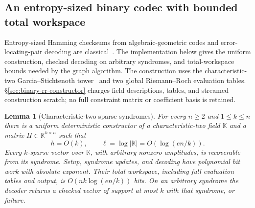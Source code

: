 \documentclass[11pt,letterpaper]{article}
\newtheorem{lemma}[theorem]{Lemma}
\numberwithin{equation}{section}
\begin{document}
\subsection{An entropy-sized binary codec with bounded total workspace}

Entropy-sized Hamming checksums from algebraic-geometric codes and error-locating-pair decoding are classical~\cite{ChengLi2021Asymmetric,Pellikaan92,DuursmaKotter94}.
The implementation below gives the uniform construction, checked decoding on arbitrary syndromes, and total-workspace bounds needed by the graph algorithm.
The construction uses the characteristic-two Garcia--Stichtenoth tower~\cite[Section~3]{GarciaStichtenoth1996Reciprocal} and two global Riemann--Roch evaluation tables.
\S\ref{sec:binary-rr-constructor} charges field descriptions, tables, and streamed construction scratch; no full constraint matrix or coefficient basis is retained.

\begin{lemma}[Characteristic-two sparse syndromes]
\label{lem:binary-paid-field-syndrome}
For every $n\ge2$ and $1\le k\le n$ there is a uniform deterministic constructor of a characteristic-two field $\mathbb K$ and a matrix $H\in \mathbb K^{h\times n}$ such that
\[
 h=O(k),\qquad \ell=\log|\mathbb K|=O(\log(en/k)).
\]
Every $k$-sparse vector over $\mathbb K$, with arbitrary nonzero amplitudes, is recoverable from its syndrome.
Setup, syndrome updates, and decoding have polynomial bit work with absolute exponent.
Their total workspace, including full evaluation tables and output, is $O(nk\log(en/k))$ bits.
On an arbitrary syndrome the decoder returns a checked vector of support at most $k$ with that syndrome, or failure.
\end{lemma}
\end{document}
